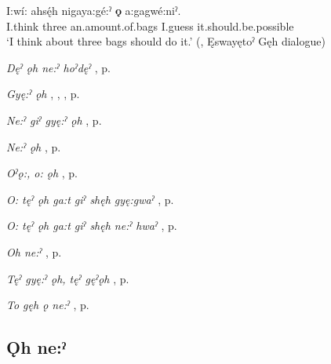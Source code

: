 \ea
\label{ex:onpart10}
\gll I:wí: ahsę́h nigaya:gé:ˀ \textbf{ǫ} a:gagwé:niˀ. \\
I.think three an.amount.of.bags I.guess it.should.be.possible\\
\glt ‘I think about three bags should do it.’ (\cite[420]{mithun_watewayestanih_1984}, Ęswayętoˀ Gęh dialogue)
\z

\begin{CayugaRelated}
\item \textit{Dęˀ ǫh ne:ˀ hoˀdęˀ} , p. \pageref{p:[dęˀ ǫh hne:ˀ hoˀdęˀ]}\\
\item \textit{Gyę:ˀ ǫh} , , , p. \pageref{p:[gyę:ˀ ǫh]}\\
\item \textit{Ne:ˀ giˀ gyę:ˀ ǫh} , p. \pageref{p:[ne:ˀ giˀ gyę:ˀ ǫh]}\\
\item \textit{Ne:ˀ ǫh} , p. \pageref{p:[ne:ˀ ǫh]}\\
\item \textit{Oˀǫ:, o: ǫh} , p. \pageref{p:[o ˀǫ:, o: ǫh]}\\
\item \textit{O: tęˀ ǫh ga:t giˀ shęh gyę:gwaˀ} , p. \pageref{p:[o: tęˀ ǫh ga:t giˀ shęh gyę:gwaˀ]}\\
\item \textit{O: tęˀ ǫh ga:t giˀ shęh ne:ˀ hwaˀ} , p. \pageref{p:[o: tęˀ ǫh ga:t giˀ shęh ne:ˀ hwaˀ]}\\
\item \textit{Oh ne:ˀ} , p. \pageref{p:[ǫh ne:ˀ]}\\
\item \textit{Tęˀ gyę:ˀ ǫh, tęˀ gęˀǫh} , p. \pageref{p:[tęˀ gyę:ˀ ǫh]}\\
\item \textit{To gęh ǫ ne:ˀ} , p. \pageref{p:[to gęh ǫ ne:ˀ]}
\end{CayugaRelated}

\subsection*{\textbf{Ǫh ne:ˀ} } \label{p:[ǫh ne:ˀ]}

